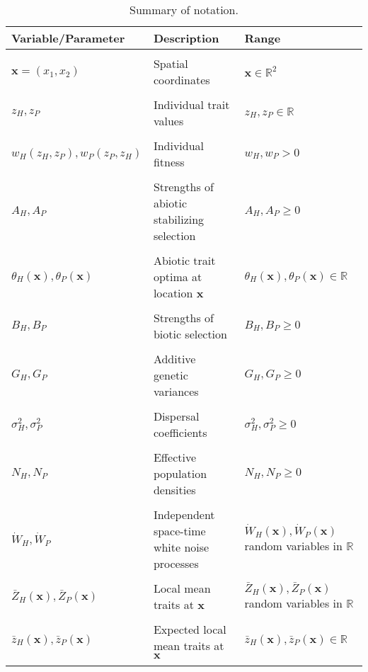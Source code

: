 \documentclass{article}
\begin{document}
\begin{table}[htbp]
\caption{Summary of notation.}
\label{Table:Parameters}
\centering
\begin{tabular}{lll}\hline
Variable/Parameter                  & Description                                  & Range                                                     \\ \hline \\
$\pmb x=(x_1,x_2)$                  & Spatial coordinates                          & $\pmb x\in\mathbb R^2$                                    \\ \\
$z_H,z_P$                           & Individual trait values                      & $z_H,z_P\in\mathbb R$                                     \\ \\
$w_H(z_H,z_P),w_P(z_P,z_H)$         & Individual fitness                           & $w_H,w_P>0$                                               \\ \\
$A_H,A_P$                           & Strengths of abiotic stabilizing selection   & $A_H,A_P\geq0$                                            \\ \\
$\theta_H(\pmb x),\theta_P(\pmb x)$ & Abiotic trait optima at location $\pmb x$    & $\theta_H(\pmb x),\theta_P(\pmb x)\in\mathbb R$           \\ \\
$B_H,B_P$                           & Strengths of biotic selection                & $B_H,B_P\geq0$                                            \\ \\
$G_H,G_P$                           & Additive genetic variances                   & $G_H,G_P\geq0$                                            \\ \\
$\sigma^2_H,\sigma^2_P$                           & Dispersal coefficients                       & $\sigma^2_H,\sigma^2_P\geq0$                                            \\ \\
$N_H,N_P$                           & Effective population densities             & $N_H,N_P\geq0$                                            \\ \\
$\dot W_H,\dot W_P$                 & Independent space-time white noise processes & $\dot W_H(\pmb x),\dot W_P(\pmb x)$ random variables in $\mathbb R$ \\ \\
$\bar Z_H(\pmb x),\bar Z_P(\pmb x)$ & Local mean traits at $\pmb x$                & $\bar Z_H(\pmb x),\bar Z_P(\pmb x)$ random variables in $\mathbb R$ \\ \\
$\bar z_H(\pmb x),\bar z_P(\pmb x)$ & Expected local mean traits at $\pmb x$       & $\bar z_H(\pmb x),\bar z_P(\pmb x)\in\mathbb R$                     \\ \\ \hline
\end{tabular}
\bigskip{}
\end{table}
\end{document}
